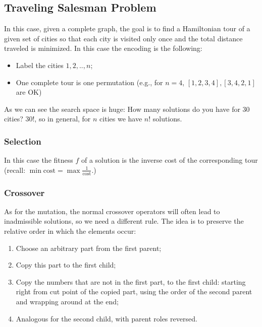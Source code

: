 \subsection{Traveling Salesman Problem}
In this case, given a complete graph, the goal is to find a Hamiltonian tour of a given set of cities so that each city is visited only once and the total distance traveled is minimized. In this case the encoding is the following:

\begin{itemize}
    \item Label the cities $1, 2, .. , n$;
    \item One complete tour is one permutation (e.g., for $n =4$, $[1,2,3,4], [3,4,2,1]$ are OK)
\end{itemize}

As we can see the search space is huge: How many solutions do you have for 30 cities? $30!$, so in general, for $n$ cities we have $n!$ solutions.

\subsubsection{Selection}
In this case the fitness $f$ of a solution is the inverse cost of the corresponding tour (recall: $\min \text{cost} = \max \frac{1}{\text{cost}}$.)

\subsubsection{Crossover}
As for the mutation, the normal crossover operators will often lead to inadmissible solutions, so we need a different rule. The idea is to preserve the relative order in which the elements occur:

\begin{enumerate}
    \item Choose an arbitrary part from the first parent;
    \item Copy this part to the first child;
    \item Copy the numbers that are not in the first part, to the first child: starting right from cut point of the copied part, using the order of the second parent and wrapping around at the end;
    \item Analogous for the second child, with parent roles reversed.
\end{enumerate}


